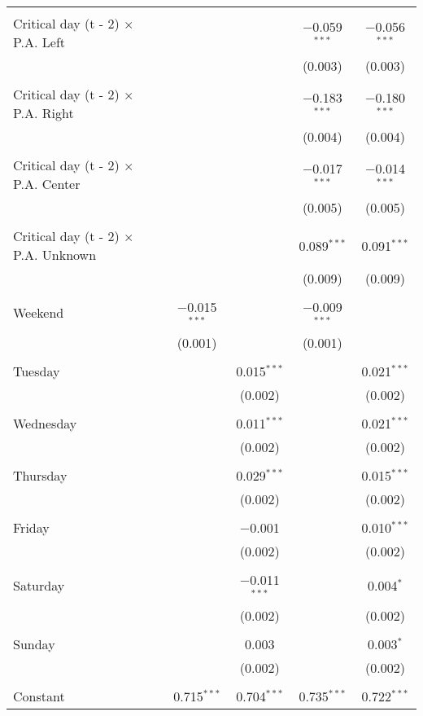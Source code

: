 \documentclass[
]{article}
\begin{document}
\begin{table}[!htbp]
{\begin{tabular}{@{\extracolsep{5pt}}lcccc}
  & & & & \\ 
 Critical day (t - 2) $\times$ P.A. Left &  &  & $-$0.059$^{***}$ & $-$0.056$^{***}$ \\ 
  &  &  & (0.003) & (0.003) \\ 
  & & & & \\ 
 Critical day (t - 2) $\times$ P.A. Right &  &  & $-$0.183$^{***}$ & $-$0.180$^{***}$ \\ 
  &  &  & (0.004) & (0.004) \\ 
  & & & & \\ 
 Critical day (t - 2) $\times$ P.A. Center &  &  & $-$0.017$^{***}$ & $-$0.014$^{***}$ \\ 
  &  &  & (0.005) & (0.005) \\ 
  & & & & \\ 
 Critical day (t - 2) $\times$ P.A. Unknown &  &  & 0.089$^{***}$ & 0.091$^{***}$ \\ 
  &  &  & (0.009) & (0.009) \\ 
  & & & & \\ 
 Weekend & $-$0.015$^{***}$ &  & $-$0.009$^{***}$ &  \\ 
  & (0.001) &  & (0.001) &  \\ 
  & & & & \\ 
 Tuesday &  & 0.015$^{***}$ &  & 0.021$^{***}$ \\ 
  &  & (0.002) &  & (0.002) \\ 
  & & & & \\ 
 Wednesday &  & 0.011$^{***}$ &  & 0.021$^{***}$ \\ 
  &  & (0.002) &  & (0.002) \\ 
  & & & & \\ 
 Thursday &  & 0.029$^{***}$ &  & 0.015$^{***}$ \\ 
  &  & (0.002) &  & (0.002) \\ 
  & & & & \\ 
 Friday &  & $-$0.001 &  & 0.010$^{***}$ \\ 
  &  & (0.002) &  & (0.002) \\ 
  & & & & \\ 
 Saturday &  & $-$0.011$^{***}$ &  & 0.004$^{*}$ \\ 
  &  & (0.002) &  & (0.002) \\ 
  & & & & \\ 
 Sunday &  & 0.003 &  & 0.003$^{*}$ \\ 
  &  & (0.002) &  & (0.002) \\ 
  & & & & \\ 
 Constant & 0.715$^{***}$ & 0.704$^{***}$ & 0.735$^{***}$ & 0.722$^{***}$ \\ 

\end{tabular}}
\end{table}
\end{document}

